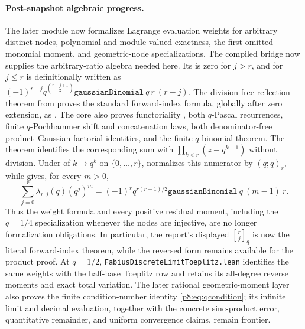 \documentclass[11pt]{article}
\numberwithin{equation}{section}
\theoremstyle{definition}
\theoremstyle{remark}
\newcommand{\qbinom}[3]{\genfrac{[}{]}{0pt}{}{#1}{#2}_{#3}}
\begin{document}
\paragraph{Post-snapshot algebraic progress.}
The later module  now formalizes Lagrange
evaluation weights for arbitrary distinct nodes, polynomial and module-valued
exactness, the first omitted monomial moment, and geometric-node
specializations.  The compiled bridge
 now supplies the arbitrary-ratio
algebra needed here.  Its  is
zero for \(j>r\), and for \(j\le r\) is definitionally written as
\( (-1)^{r-j}q^{\binom{r-j+1}{2}}
\texttt{gaussianBinomial}\ q\ r\ (r-j)\).  The division-free reflection
theorem  from
 proves the standard forward-index formula,
globally after zero extension, as
.  The core also proves
functoriality , both \(q\)-Pascal recurrences,
finite \(q\)-Pochhammer shift and concatenation laws, both denominator-free
product--Gaussian factorial identities, and the finite \(q\)-binomial
theorem.  The theorem
 identifies the corresponding
sum with \(\prod_{k<r}(z-q^{k+1})\) without division.  Under
 of \(k\mapsto q^k\) on \(\{0,\ldots,r\}\),
 normalizes this
numerator by \((q;q)_r\), while
 gives,
for every \(m>0\),
\[
 \sum_{j=0}^{r}\lambda_{r,j}(q)(q^j)^m
 =(-1)^r q^{r(r+1)/2}
   \texttt{gaussianBinomial}\ q\ (m-1)\ r.
\]
Thus the weight formula and every positive residual moment, including the
\(q=1/4\) specialization whenever the nodes are injective, are no longer
formalization obligations.  In particular, the report's displayed
\(\qbinom{r}{j}{q}\) is now the literal forward-index theorem, while the
reversed form remains available for the product proof.  At \(q=1/2\),
\texttt{FabiusDiscreteLimitToeplitz.lean} identifies the same weights with
the half-base Toeplitz row and retains its all-degree reverse moments and
exact total variation.  The later rational geometric-moment layer also proves
the finite condition-number identity \cref{p8:eq:qcondition}; its infinite limit
and decimal evaluation, together with the concrete sinc-product error,
quantitative remainder, and uniform convergence claims, remain frontier.
\end{document}
